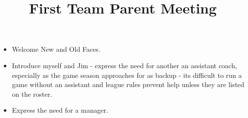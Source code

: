 \documentclass[10pt,letterpaper]{article}
\title{\vspace{-.5in}First Team Parent Meeting}
\author{}
\date{}
\newenvironment{agendablock}[1]{%
    \tcolorbox[beamer,%
    noparskip,breakable,
    colback=LightGray,colframe=Black,%
    colbacklower=Gray!75!LightGray,%
    title=#1]}%
    {\endtcolorbox}
\begin{document}
\selectfont
\maketitle

\begin{agendablock}{Welcome}
    \begin{itemize}
        \item Welcome New and Old Faces.
        \item Introduce myself and Jim - express the need for another an assistant coach, especially as the game season approaches for as backup - its difficult to run a game without an assistant and league rules prevent help unless they are listed on the roster.
        \item Express the need for a manager.
    \end{itemize}
\end{agendablock}
\end{document}
